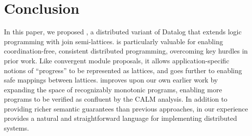 \section{Conclusion}

In this paper, we proposed \lang, a distributed variant of Datalog that extends logic programming with join semi-lattices. \lang is particularly valuable for enabling
coordination-free, consistent distributed programming, overcoming key hurdles in prior work.  Like convergent module proposals, it allows application-specific notions of ``progress'' to be
represented as lattices, and goes further to enabling safe mappings between lattices.  
\lang improves upon our own earlier work by expanding the space of recognizably monotonic
programs, enabling more programs to be verified as confluent by the CALM
analysis.  In addition to providing richer semantic guarantees than previous approaches, in our experience \lang provides a natural and straightforward language for implementing distributed systems.

